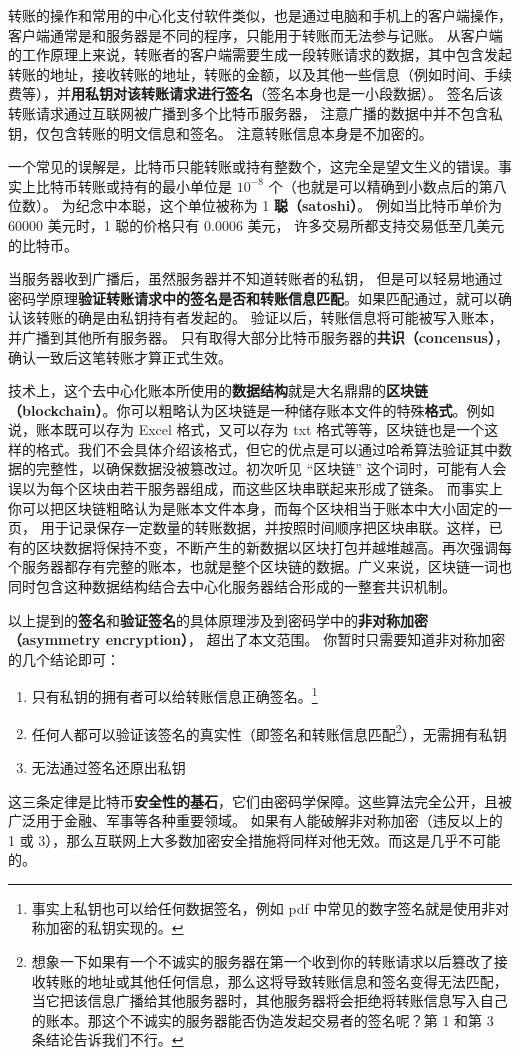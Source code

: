 转账的操作和常用的中心化支付软件类似，也是通过电脑和手机上的客户端操作，客户端通常是和服务器是不同的程序，只能用于转账而无法参与记账。 从客户端的工作原理上来说，转账者的客户端需要生成一段转账请求的数据，其中包含发起转账的地址，接收转账的地址，转账的金额，以及其他一些信息（例如时间、手续费等），并\textbf{用私钥对该转账请求进行签名}（签名本身也是一小段数据）。 签名后该转账请求通过互联网被广播到多个比特币服务器， 注意广播的数据中并不包含私钥，仅包含转账的明文信息和签名。 注意转账信息本身是不加密的。

一个常见的误解是，比特币只能转账或持有整数个，这完全是望文生义的错误。事实上比特币转账或持有的最小单位是 $10^{-8}$ 个（也就是可以精确到小数点后的第八位数）。 为纪念中本聪，这个单位被称为 1 \textbf{聪（satoshi）}。 例如当比特币单价为 60000 美元时，1 聪的价格只有 0.0006 美元， 许多交易所都支持交易低至几美元的比特币。

当服务器收到广播后，虽然服务器并不知道转账者的私钥， 但是可以轻易地通过密码学原理\textbf{验证转账请求中的签名是否和转账信息匹配}。如果匹配通过，就可以确认该转账的确是由私钥持有者发起的。 验证以后，转账信息将可能被写入账本，并广播到其他所有服务器。 只有取得大部分比特币服务器的\textbf{共识（concensus）}， 确认一致后这笔转账才算正式生效。

技术上，这个去中心化账本所使用的\textbf{数据结构}就是大名鼎鼎的\textbf{区块链（blockchain）}。你可以粗略认为区块链是一种储存账本文件的特殊\textbf{格式}。例如说，账本既可以存为 Excel 格式，又可以存为 txt 格式等等，区块链也是一个这样的格式。我们不会具体介绍该格式，但它的优点是可以通过哈希算法验证其中数据的完整性，以确保数据没被篡改过。初次听见 “区块链” 这个词时，可能有人会误以为每个区块由若干服务器组成，而这些区块串联起来形成了链条。 而事实上你可以把区块链粗略认为是账本文件本身，而每个区块相当于账本中大小固定的一页， 用于记录保存一定数量的转账数据，并按照时间顺序把区块串联。这样，已有的区块数据将保持不变，不断产生的新数据以区块打包并越堆越高。再次强调每个服务器都存有完整的账本，也就是整个区块链的数据。广义来说，区块链一词也同时包含这种数据结构结合去中心化服务器结合形成的一整套共识机制。

以上提到的\textbf{签名}和\textbf{验证签名}的具体原理涉及到密码学中的\textbf{非对称加密（asymmetry encryption）}， 超出了本文范围。 你暂时只需要知道非对称加密的几个结论即可：
\begin{enumerate}
\item 只有私钥的拥有者可以给转账信息正确签名。\footnote{事实上私钥也可以给任何数据签名，例如 pdf 中常见的数字签名就是使用非对称加密的私钥实现的。}
\item 任何人都可以验证该签名的真实性（即签名和转账信息匹配\footnote{想象一下如果有一个不诚实的服务器在第一个收到你的转账请求以后篡改了接收转账的地址或其他任何信息，那么这将导致转账信息和签名变得无法匹配，当它把该信息广播给其他服务器时，其他服务器将会拒绝将转账信息写入自己的账本。那这个不诚实的服务器能否伪造发起交易者的签名呢？第 1 和第 3 条结论告诉我们不行。}），无需拥有私钥
\item 无法通过签名还原出私钥
\end{enumerate}
这三条定律是比特币\textbf{安全性的基石}，它们由密码学保障。这些算法完全公开，且被广泛用于金融、军事等各种重要领域。 如果有人能破解非对称加密（违反以上的 1 或 3），那么互联网上大多数加密安全措施将同样对他无效。而这是几乎不可能的。

